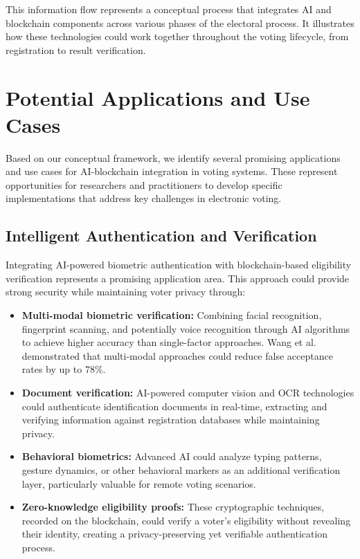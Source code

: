 \documentclass[conference]{IEEEtran}
\begin{document}
This information flow represents a conceptual process that integrates AI and blockchain components across various phases of the electoral process. It illustrates how these technologies could work together throughout the voting lifecycle, from registration to result verification.

\section{Potential Applications and Use Cases}
Based on our conceptual framework, we identify several promising applications and use cases for AI-blockchain integration in voting systems. These represent opportunities for researchers and practitioners to develop specific implementations that address key challenges in electronic voting.

\subsection{Intelligent Authentication and Verification}
Integrating AI-powered biometric authentication with blockchain-based eligibility verification represents a promising application area. This approach could provide strong security while maintaining voter privacy through:

\begin{itemize}
    \item \textbf{Multi-modal biometric verification:} Combining facial recognition, fingerprint scanning, and potentially voice recognition through AI algorithms to achieve higher accuracy than single-factor approaches. Wang et al. \cite{b11} demonstrated that multi-modal approaches could reduce false acceptance rates by up to 78\%.
    
    \item \textbf{Document verification:} AI-powered computer vision and OCR technologies could authenticate identification documents in real-time, extracting and verifying information against registration databases while maintaining privacy.
    
    \item \textbf{Behavioral biometrics:} Advanced AI could analyze typing patterns, gesture dynamics, or other behavioral markers as an additional verification layer, particularly valuable for remote voting scenarios.
    
    \item \textbf{Zero-knowledge eligibility proofs:} These cryptographic techniques, recorded on the blockchain, could verify a voter's eligibility without revealing their identity, creating a privacy-preserving yet verifiable authentication process.
\end{itemize}
\end{document}
